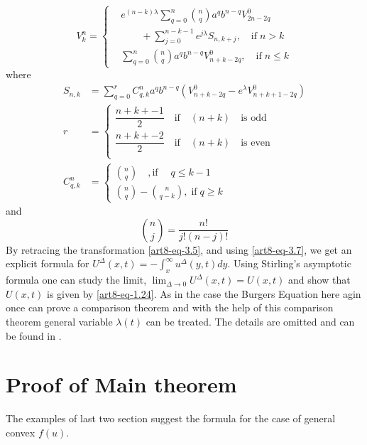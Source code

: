 \begin{equation}\label{art8-eq-3.7}
V_{k}^{n}=\left\{
\begin{aligned}
&e^{(n-k)\lambda}\sum\limits_{q=0}^{n}\binom{n}{q}a^{q}b^{n-q}V_{2n-2q}^{0}\\
&\qquad + \sum\limits_{j=0}^{n-k-1} e^{j\lambda}S_{n,k+j},\quad \text{if} \; n > k\\
&\sum\limits_{q=0}^{n}\binom{n}{q}a^{q}b^{n-q}V_{n+k-2q}^{0},\quad \text{if} \; n\leq k
\end{aligned}
\right.
\end{equation}
where
\begin{align*}
S_{n,k} &=\sum\limits_{q=0}^{r}C_{q,k}^{n}a^{q}b^{n-q}\left(V_{n+k-2q}^{0}-e^{\lambda}V_{n+k+1-2q}^{0}\right)\\
r &= 
\begin{cases}
 \dfrac{n+k+-1}{2}\quad \text{if}\quad (n+k)\quad \text{is odd}\\
 \dfrac{n+k+-2}{2}\quad \text{if}\quad (n+k)\quad \text{is even}\\
\end{cases}\\
C_{q,k}^{n}&=
\begin{cases}
\binom{n}{q} \quad , \text{if}\; \quad q \leq k-1\\
\binom{n}{q}-\binom{n}{q-k},\; \text{if}\; q \geq k
\end{cases}
\end{align*}
and
$$
\binom{n}{j} = \dfrac{n!}{j!(n-j)!}
$$
By retracing the transformation \eqref{art8-eq-3.5}, and using \eqref{art8-eq-3.7}, we get an explicit formula for $U^{\Delta}(x,t)= -\int_{x}^{\infty}u^{\Delta}(y,t)dy$. Using Stirling's asymptotic formula one can study the limit, $\lim_{\Delta \rightarrow 0}U^{\Delta}(x,t) =U(x, t)$ and show that $U(x,t)$ is given by \eqref{art8-eq-1.24}. As in the case the Burgers Equation here agin once can prove a comparison theorem and with the help of this comparison theorem general variable $\lambda(t)$ can be treated. The details are omitted and can be found in \cite{art8-key8}.

\section{Proof of Main theorem}\label{art8-sec-4}
The examples of last two section suggest the formula for the case of general convex $f(u)$.

